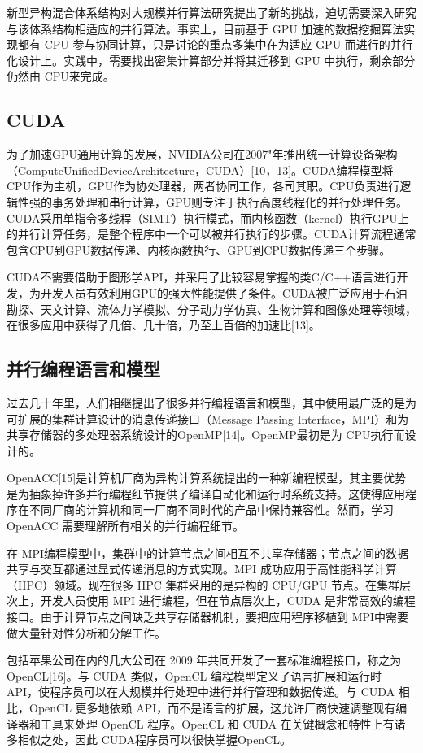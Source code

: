 \documentclass{article}
\begin{document}
\begin{multicols}{2}
    新型异构混合体系结构对大规模并行算法研究提出了新的挑战，迫切需要深入研究与该体系结构相适应的并行算法。事实上，目前基于 GPU 加速的数据挖掘算法实现都有 CPU 参与协同计算，只是讨论的重点多集中在为适应 GPU 而进行的并行化设计上。实践中，需要找出密集计算部分并将其迁移到 GPU 中执行，剩余部分仍然由 CPU来完成。
    
    \subsection{CUDA}
    为了加速GPU通用计算的发展，NVIDIA公司在2007"年推出统一计算设备架构（ComputeUnifiedDeviceArchitecture，CUDA）[10，13]。CUDA编程模型将CPU作为主机，GPU作为协处理器，两者协同工作，各司其职。CPU负责进行逻辑性强的事务处理和串行计算，GPU则专注于执行高度线程化的并行处理任务。CUDA采用单指令多线程（SIMT）执行模式，而内核函数（kernel）执行GPU上的并行计算任务，是整个程序中一个可以被并行执行的步骤。CUDA计算流程通常包含CPU到GPU数据传递、内核函数执行、GPU到CPU数据传递三个步骤。
    
    CUDA不需要借助于图形学API，并采用了比较容易掌握的类C/C++语言进行开发，为开发人员有效利用GPU的强大性能提供了条件。CUDA被广泛应用于石油勘探、天文计算、流体力学模拟、分子动力学仿真、生物计算和图像处理等领域，在很多应用中获得了几倍、几十倍，乃至上百倍的加速比[13]。
    
    \subsection{并行编程语言和模型}
    过去几十年里，人们相继提出了很多并行编程语言和模型，其中使用最广泛的是为可扩展的集群计算设计的消息传递接口（Message Passing Interface，MPI）和为共享存储器的多处理器系统设计的OpenMP[14]。OpenMP最初是为 CPU执行而设计的。
    
    OpenACC[15]是计算机厂商为异构计算系统提出的一种新编程模型，其主要优势是为抽象掉许多并行编程细节提供了编译自动化和运行时系统支持。这使得应用程序在不同厂商的计算机和同一厂商不同时代的产品中保持兼容性。然而，学习 OpenACC 需要理解所有相关的并行编程细节。
    
    在 MPI编程模型中，集群中的计算节点之间相互不共享存储器；节点之间的数据共享与交互都通过显式传递消息的方式实现。MPI 成功应用于高性能科学计算（HPC）领域。现在很多 HPC 集群采用的是异构的 CPU/GPU 节点。在集群层次上，开发人员使用 MPI 进行编程，但在节点层次上，CUDA 是非常高效的编程接口。由于计算节点之间缺乏共享存储器机制，要把应用程序移植到 MPI中需要做大量针对性分析和分解工作。
    
    包括苹果公司在内的几大公司在 2009 年共同开发了一套标准编程接口，称之为 OpenCL[16]。与 CUDA 类似，OpenCL 编程模型定义了语言扩展和运行时 API，使程序员可以在大规模并行处理中进行并行管理和数据传递。与 CUDA 相比，OpenCL 更多地依赖 API，而不是语言的扩展，这允许厂商快速调整现有编译器和工具来处理 OpenCL 程序。OpenCL 和 CUDA 在关键概念和特性上有诸多相似之处，因此 CUDA程序员可以很快掌握OpenCL。


\end{multicols}
\end{document}
